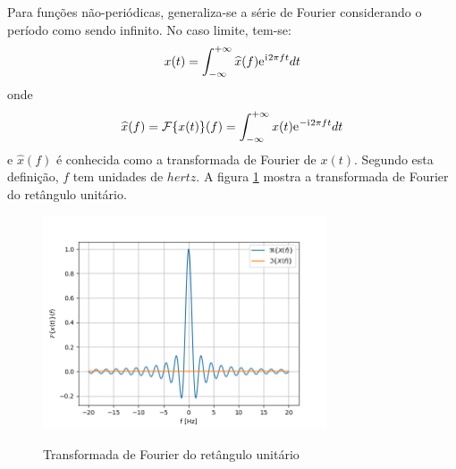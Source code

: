 \documentclass[12pt,a4paper]{report}
\newcommand{\I}{{\mathrm{i}\mkern1mu}}
\newcommand{\euler}{{\mathrm{e}\mkern1mu}}
\begin{document}
  Para funções não-periódicas, generaliza-se a série de Fourier considerando o período como sendo infinito.
  No caso limite, tem-se:
  \begin{equation}
    x(t) = \int_{-\infty}^{+\infty} \widehat{x}(f) \euler^{\I 2 \pi f t} dt
  \end{equation}
  onde
  \begin{equation}
    \widehat{x}(f) = \mathcal{F}\{x(t)\}(f) = \int_{-\infty}^{+\infty} x(t) \euler^{-\I 2 \pi f t} dt
  \end{equation}
  e $\widehat{x}(f)$ é conhecida como a transformada de Fourier de $x(t)$. Segundo esta definição, $f$ tem
  unidades de $hertz$. A figura \ref{fig:fourier_transform} mostra a transformada de Fourier do retângulo
  unitário.
  \begin{figure}[H]
    \caption{Transformada de Fourier do retângulo unitário}
    \centering
    \includegraphics[width=0.75\textwidth]{fourier_transform}
    \label{fig:fourier_transform}
  \end{figure}
\end{document}
